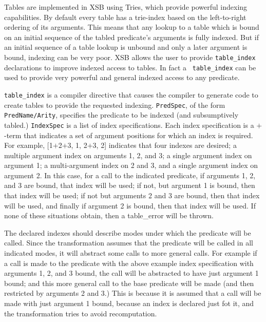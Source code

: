 \begin{description}
\begin{description}

Tables are implemented in XSB using Tries, which provide powerful
indexing capabilities.  By default every table has a trie-index based
on the left-to-right ordering of its arguments.  This means that any
lookup to a table which is bound on an initial sequence of the tabled
predicate's arguments is fully indexed.  But if an initial sequence of
a table lookup is unbound and only a later argument is bound, indexing
can be very poor.  XSB allows the user to provide {\tt table\_index}
declarations to improve indexed access to tables.  In fact a {\tt
  table\_index} can be used to provide very powerful and general
indexed access to any predicate.

%
{\tt table\_index} is a compiler directive that causes the compiler to
generate code to create tables to provide the requested indexing.
{\tt PredSpec}, of the form {\tt PredName/Arity}, specifies the
predicate to be indexed (and subsumptively tabled.)  {\tt IndexSpec} is a list of
index specifications.  Each index specification is a $+$-term that
indicates a set of argument positions for which an index is required.
For example, [1$+$2$+$3, 1, 2$+$3, 2] indicates that four indexes are
desired; a multiple argument index on arguments 1, 2, and 3; a single
argument index on argument 1; a multi-argument index on 2 and 3, and a
single argument index on argument 2.  In this case, for a call to the
indicated predicate, if arguments 1, 2, and 3 are bound, that index
will be used; if not, but argument 1 is bound, then that index will be
used; if not but arguments 2 and 3 are bound, then that index will be
used, and finally if argument 2 is bound, then that index will be
used.  If none of these situations obtain, then a table\_error will be
thrown.

The declared indexes should describe modes under which the predicate
will be called.  Since the transformation assumes that the predicate
will be called in all indicated modes, it will abstract some calls to
more general calls.  For example if a call is made to the predicate
with the above example index specification with arguments 1, 2, and 3
bound, the call will be abstracted to have just argument 1 bound; and
this more general call to the base predicate will be made (and then
restricted by arguments 2 and 3.)  This is because it is assumed that
a call will be made with just argument 1 bound, because an index is
declared just fot it, and the transformation tries to avoid
recomputation.


\end{description}
\end{description}
